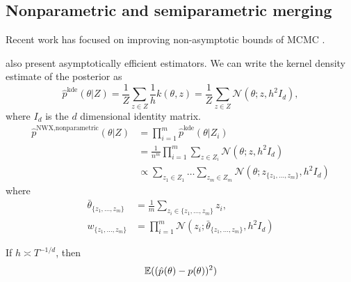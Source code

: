 \documentclass[thesis.tex]{subfiles}
\newcommand{\mse}[1]{}
\newcommand{\eye}[1]{I_{#1}}
\newcommand{\p}[1]{p({#1})}
\newcommand{\psup}[2]{\hat p^{#1}({#2})}
\newcommand{\phat}[1]{\psup{}{#1}}
\newcommand{\pkde}[1]{\psup{\text{kde}}{#1}}
\newcommand{\pnp}[1]{\psup{\text{NWX,nonparametric}}{#1}}
\newcommand{\gaussian}[3]{\mathcal N({#1};{#2},{#3})}
\begin{document}

\subsection{Nonparametric and semiparametric merging}

Recent work has focused on improving non-asymptotic bounds of MCMC 
\citep[e.g.][]{latuszynski2013nonasymptotic,andrieu2015convergence,adamczak2015exponential,andrieu2016establishing}.

\cite{neiswanger2014asymptotically} also present asymptotically efficient estimators.
We can write the kernel density estimate of the posterior as
\begin{equation}
    \pkde{\theta|Z}
    =
    \frac{1}{Z}\sum_{z\in Z}
    \frac{1}{h}k(\theta,z)
    =
    \frac{1}{Z}\sum_{z\in Z}
    \gaussian{\theta}{z}{h^2 \eye d}
    ,
\end{equation}
where $\eye d$ is the $d$ dimensional identity matrix.
\begin{align}
    \pnp{\theta|Z}
    &=
    \prod_{i=1}^m \pkde{\theta|Z_i}
    \\
    &=
    \frac{1}{n^m}
    \prod_{i=1}^m 
    \sum_{z\in Z_i}
    \gaussian{\theta}{z}{h^2 \eye d}
    \\
    &\propto
    \sum_{z_1\in Z_1}
    \dots
    \sum_{z_m\in Z_m}
    \gaussian{\theta}{z_{\{z_1,...,z_m\}}}{h^2 \eye d}
\end{align}
where
\begin{align}
    \bar\theta_{\{z_1,...,z_m\}} 
    &= 
    \frac{1}{m}\sum_{z_i\in\{z_1,...,z_m\}} z_i
    ,
    \\
    w_{\{z_1,...,z_m\}} 
    &=
    \prod_{i=1}^m\gaussian{z_i}{\bar\theta_{\{z_1,...,z_m\}}}{h^2\eye d}
\end{align}

\begin{theorem}
    If $h \asymp T^{-1/d}$,
    then
    \begin{equation}
        \mse{}
        \E((\phat{\theta} - \p{\theta})^2)
    \end{equation}
\end{theorem}
\end{document}
